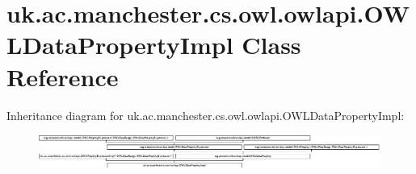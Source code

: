\hypertarget{classuk_1_1ac_1_1manchester_1_1cs_1_1owl_1_1owlapi_1_1_o_w_l_data_property_impl}{\section{uk.\-ac.\-manchester.\-cs.\-owl.\-owlapi.\-O\-W\-L\-Data\-Property\-Impl Class Reference}
\label{classuk_1_1ac_1_1manchester_1_1cs_1_1owl_1_1owlapi_1_1_o_w_l_data_property_impl}
}
Inheritance diagram for uk.\-ac.\-manchester.\-cs.\-owl.\-owlapi.\-O\-W\-L\-Data\-Property\-Impl\-:\begin{figure}[H]
\begin{center}
\leavevmode
\includegraphics[height=1.122807cm]{classuk_1_1ac_1_1manchester_1_1cs_1_1owl_1_1owlapi_1_1_o_w_l_data_property_impl}
\end{center}
\end{figure}
